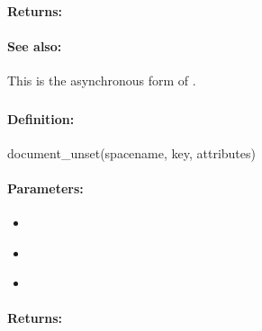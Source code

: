 \paragraph{Returns:}


\paragraph{See also:}  This is the asynchronous form of .

\pagebreak
\subsubsection{}
\label{api:ruby:document_unset}


\paragraph{Definition:}
\begin{rubycode}
document_unset(spacename, key, attributes)
\end{rubycode}

\paragraph{Parameters:}
\begin{itemize}[noitemsep]
\item {}\\

\item {}\\

\item {}\\

\end{itemize}

\paragraph{Returns:}


\pagebreak
\subsubsection{}
\label{api:ruby:async_document_unset}


